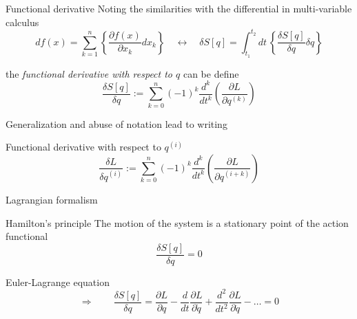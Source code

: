 \documentclass[10pt]{beamer}
\begin{document}
  \begin{frame}{Functional derivative}
    Noting the similarities with the differential in multi-variable calculus
    \begin{equation*}
      df(x) = \sum_{k=1}^{n}
      \left\{\frac{\partial f(x)}{\partial x_k} dx_k\right\}
      \quad \longleftrightarrow \quad
      \delta S[q] = \int_{t_1}^{t_2} dt \,
      \left\{ \frac{\delta S[q]}{\delta q} \delta q \right\}
    \end{equation*}

    the \emph{functional derivative with respect to $q$} can be define
    \begin{equation*}
      \frac{\delta S[q]}{\delta q}:=
      \sum_{k=0}^{n} {(-1)}^k \frac{d^k}{dt^k}
      \left(\frac{\partial L}{\partial q^{(k)}}\right)
    \end{equation*}

    Generalization and abuse of notation lead to writing
    \begin{block}{Functional derivative with respect to $q^{(i)}$}
      \begin{equation*}
        \frac{\delta L}{\delta q^{(i)}}:=
        \sum_{k=0}^{n} {(-1)}^k \frac{d^k}{dt^k}
        \left(\frac{\partial L}{\partial q^{(i+k)}}\right)
      \end{equation*}
    \end{block}
  \end{frame}

  \begin{frame}{Lagrangian formalism}
    \begin{alertblock}{Hamilton's principle}
      \vspace{0.5em}
      The motion of the system is a stationary point of the action
      functional~\cite{Goldstein11_Ham_principle}
      \begin{equation*}
        \frac{\delta S[q]}{\delta q} = 0
      \end{equation*}
    \end{alertblock}
    \begin{alertblock}{Euler-Lagrange equation}
      \vspace{0.5em}
      \begin{equation*}
        \Rightarrow \qquad
        \frac{\delta S[q]}{\delta q} =
        \frac{\partial L}{\partial q} -
        \frac{d}{dt}\frac{\partial L}{\partial \dot{q}} +
        \frac{d^2}{dt^2}\frac{\partial L}{\partial \ddot{q}} -
        \ldots = 0
      \end{equation*}
    \end{alertblock}
  \end{frame}
\end{document}

